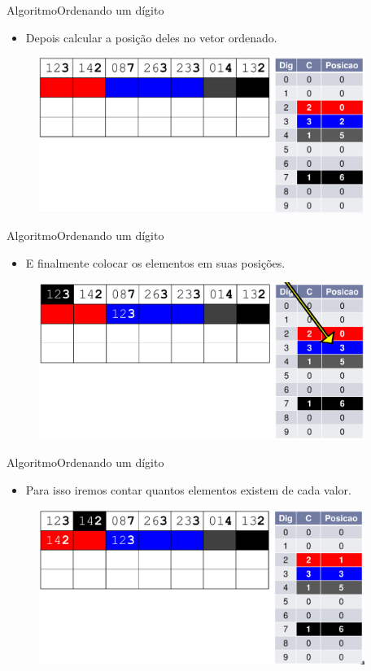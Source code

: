 \documentclass[aspectratio=169]{beamer}
\begin{document}
\begin{frame}{Algoritmo}{Ordenando um dígito}
\begin{itemize}
\item  Depois calcular a posição deles no vetor ordenado.
\end{itemize}
\begin{figure}[!h]
  \centering
  \includegraphics[width=300pt]{imgs/radix3.png}
  \label{radix3}
\end{figure}
\end{frame}

\begin{frame}{Algoritmo}{Ordenando um dígito}
\begin{itemize}
\item E finalmente colocar os elementos em suas posições.
\end{itemize}
\begin{figure}[!h]
  \centering
  \includegraphics[width=300pt]{imgs/radix4.png}
  \label{radix4}
\end{figure}
\end{frame}

\begin{frame}{Algoritmo}{Ordenando um dígito}
\begin{itemize}
\item Para isso iremos contar quantos elementos existem de cada valor.
\end{itemize}
\begin{figure}[!h]
  \centering
  \includegraphics[width=300pt]{imgs/radix5.png}
  \label{radix5}
\end{figure}
\end{frame}
\end{document}
